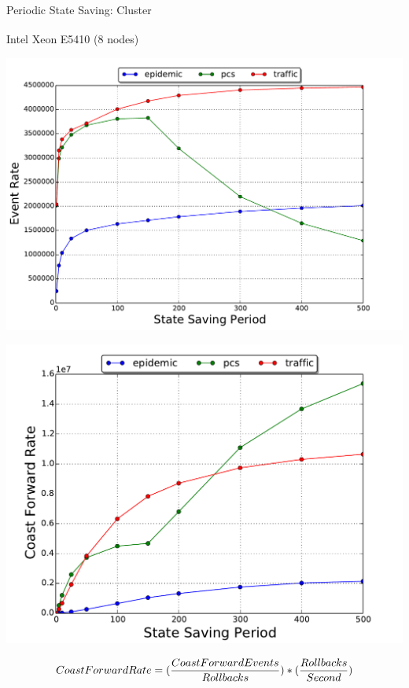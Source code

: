 \documentclass[10pt]{beamer}
\begin{document}
\begin{frame}{Periodic State Saving: Cluster}
    \begin{block}{Intel\textsuperscript{\textregistered} Xeon\textsuperscript{\textregistered} E5410 (8 nodes)}
        \smallskip
        \begin{minipage}{0.55\textwidth}
            \includegraphics[width=\textwidth]{../figs/state_saving/beowulf/eventrate_500.pdf}
        \end{minipage}%
        \begin{minipage}{0.55\textwidth}
            \includegraphics[width=\textwidth]{../figs/state_saving/beowulf/cf_rate_500.pdf}
        \end{minipage}
        $$ CoastForwardRate = ({CoastForwardEvents \over Rollbacks}) * ({Rollbacks \over Second}) $$
    \end{block}
\end{frame}
\end{document}
